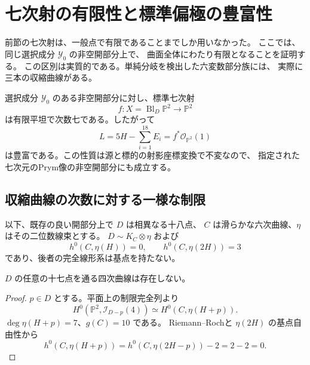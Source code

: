 \section{七次射の有限性と標準偏極の豊富性}
\label{sec:septic-finiteness-v30}

前節の七次射は、一般点で有限であることまでしか用いなかった。
ここでは、同じ選択成分 $\mathcal Y_0$ の非空開部分上で、
曲面全体にわたり有限となることを証明する。
この区別は実質的である。単純分岐を検出した六変数部分族には、
実際に三本の収縮曲線がある。

\begin{theorem}[標準七次射の有限平坦性]
\label{thm:septic-finiteness-v30}
選択成分 $\mathcal Y_0$ のある非空開部分に対し、標準七次射
\[
 f:X=\operatorname{Bl}_{D}\mathbb P^2\longrightarrow\mathbb P^2
\]
は有限平坦で次数七である。したがって
\[
 L=5H-\sum_{i=1}^{18}E_i=f^*\mathcal O_{\mathbb P^2}(1)
\]
は豊富である。この性質は源と標的の射影座標変換で不変なので、
指定された七次元のPrym像の非空開部分にも成立する。
\end{theorem}

\subsection{収縮曲線の次数に対する一様な制限}

以下、既存の良い開部分上で $D$ は相異なる十八点、
$C$ は滑らかな六次曲線、$\eta$ はその二位数線束とする。
$D\sim K_C\otimes\eta$ および
\[
 h^0(C,\eta(H))=0,\qquad
 h^0(C,\eta(2H))=3
\]
であり、後者の完全線形系は基点を持たない。

\begin{lemma}
\label{lem:septic-CB4-v30}
$D$ の任意の十七点を通る四次曲線は存在しない。
\end{lemma}
\begin{proof}
$p\in D$ とする。平面上の制限完全列より
\[
 H^0(\mathbb P^2,\mathcal I_{D-p}(4))
 \simeq H^0(C,\eta(H+p)).
\]
$\deg\eta(H+p)=7$、$g(C)=10$ である。
Riemann--Rochと $\eta(2H)$ の基点自由性から
\[
 h^0(C,\eta(H+p))
 =h^0(C,\eta(2H-p))-2=2-2=0.
\]
\end{proof}

